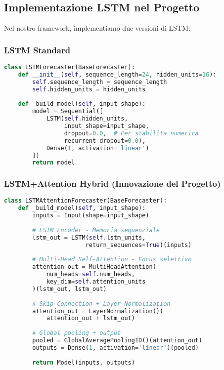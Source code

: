 \documentclass[12pt,a4paper,twoside]{report}
\begin{document}
\subsection{Implementazione LSTM nel Progetto}

Nel nostro framework, implementiamo due versioni di LSTM:

\subsubsection{LSTM Standard}
\begin{lstlisting}[language=Python, caption=LSTM Standard Implementation]
class LSTMForecaster(BaseForecaster):
    def __init__(self, sequence_length=24, hidden_units=16):
        self.sequence_length = sequence_length
        self.hidden_units = hidden_units
        
    def _build_model(self, input_shape):
        model = Sequential([
            LSTM(self.hidden_units, 
                 input_shape=input_shape,
                 dropout=0.0,  # Per stabilita numerica
                 recurrent_dropout=0.0),
            Dense(1, activation='linear')
        ])
        return model
\end{lstlisting}

\subsubsection{LSTM+Attention Hybrid (Innovazione del Progetto)}
\begin{lstlisting}[language=Python, caption=LSTM+Attention Breakthrough]
class LSTMAttentionForecaster(BaseForecaster):
    def _build_model(self, input_shape):
        inputs = Input(shape=input_shape)
        
        # LSTM Encoder - Memoria sequenziale
        lstm_out = LSTM(self.lstm_units, 
                       return_sequences=True)(inputs)
        
        # Multi-Head Self-Attention - Focus selettivo
        attention_out = MultiHeadAttention(
            num_heads=self.num_heads,
            key_dim=self.attention_units
        )(lstm_out, lstm_out)
        
        # Skip Connection + Layer Normalization
        attention_out = LayerNormalization()(
            attention_out + lstm_out)
        
        # Global pooling + output
        pooled = GlobalAveragePooling1D()(attention_out)
        outputs = Dense(1, activation='linear')(pooled)
        
        return Model(inputs, outputs)
\end{lstlisting}
\end{document}
